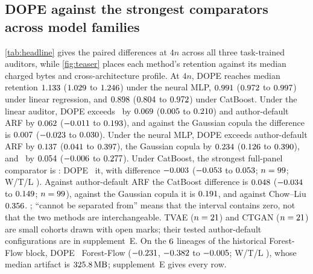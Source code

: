 \documentclass{article} %
\begin{document}
\subsection{DOPE against the strongest comparators across model families}
\label{sec:headline}
\cref{tab:headline} gives the paired differences at $4n$ across all three task-trained auditors, while \cref{fig:teaser} places each method's retention against its median charged bytes and cross-architecture profile. At $4n$, DOPE reaches median retention $1.133$ ($1.029$ to $1.246$) under the neural MLP, $0.991$ ($0.972$ to $0.997$) under linear regression, and $0.898$ ($0.804$ to $0.972$) under CatBoost. Under the linear auditor, DOPE exceeds \VStrongestName\ by $0.069$ ($0.005$ to $0.210$) and author-default ARF by $0.062$ ($-0.011$ to $0.193$), and against the Gaussian copula the difference is $0.007$ ($-0.023$ to $0.030$). Under the neural MLP, DOPE exceeds author-default ARF by $0.137$ ($0.041$ to $0.397$), the Gaussian copula by $0.234$ ($0.126$ to $0.390$), and \VStrongestName\ by $0.054$ ($-0.006$ to $0.277$). Under CatBoost, the strongest full-panel comparator is \VStrongestName: DOPE \VVerdictStrong\ it, with difference $-0.003$ ($-0.053$ to $0.053$; $n=99$; W/T/L \VStrongWtl). Against author-default ARF the CatBoost difference is $0.048$ ($-0.034$ to $0.149$; $n=99$), against the Gaussian copula it is $0.191$, and against Chow--Liu $0.356$. \VEquivResults; ``cannot be separated from'' means that the interval contains zero, not that the two methods are interchangeable. TVAE ($n=21$) and CTGAN ($n=21$) are small cohorts drawn with open marks; their tested author-default configurations are in supplement~E. On the $6$ lineages of the historical Forest-Flow block, DOPE \VVerdictForestCbFour\ Forest-Flow ($-0.231$, $-0.382$ to $-0.005$; W/T/L \VWtlForestCbFour), whose median artifact is $325.8\,\mathrm{MB}$; supplement~E gives every row.
\end{document}
